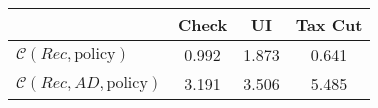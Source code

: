 \begin{tabular}{@{}lccc@{}} 
\toprule 
                          & Check      & UI    & Tax Cut    \\  \midrule 
$\mathcal{C}(Rec,\text{policy})$ & 0.992  & 1.873  & 0.641     \\ 
$\mathcal{C}(Rec, AD,\text{policy})$ & 3.191  & 3.506  & 5.485     \\ 
\end{tabular}  
